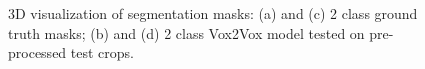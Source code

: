 \begin{figure}[!htb]
\centering
{}\hfil
{}

\hfil 
{}

\caption{\ac{3D} visualization of segmentation masks: (a) and (c) 2 class ground truth masks; (b) and (d) 2 class Vox2Vox model tested on pre-processed test crops.}

\label{fig:results-vox2vox-2channel}

\end{figure}

